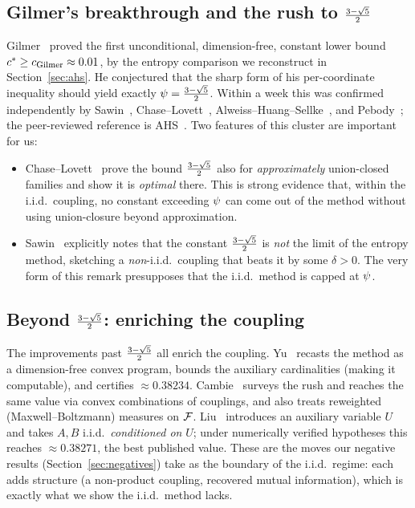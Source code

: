 \documentclass[11pt]{amsart}
\theoremstyle{definition}
\theoremstyle{remark}
\begin{document}
\subsection{Gilmer's breakthrough and the rush to $\tfrac{3-\sqrt{5}}{2}$}
Gilmer~\cite{gilmer2022} proved the first unconditional, dimension-free, constant
lower bound $c^{\ast}\ge c_{\text{Gilmer}}\approx 0.01$,
by the entropy comparison we reconstruct in Section~\ref{sec:ahs}. He conjectured
that the sharp form of his per-coordinate inequality should yield exactly
$\psi=\tfrac{3-\sqrt{5}}{2}$. Within a week this was confirmed independently by
Sawin~\cite{sawin2022}, Chase--Lovett~\cite{chaselovett2022},
Alweiss--Huang--Sellke~\cite{ahs2023}, and Pebody~\cite{pebody2022}; the
peer-reviewed reference is AHS~\cite{ahs2023}.
Two features of this cluster are important for us:
\begin{itemize}[leftmargin=1.4em]
\item Chase--Lovett~\cite{chaselovett2022} prove the bound $\tfrac{3-\sqrt{5}}{2}$ also for
\emph{approximately} union-closed families and show it is \emph{optimal} there.
This is strong evidence that, within the i.i.d.\ coupling, no constant exceeding
$\psi$ can come out of the method without using union-closure beyond
approximation.
\item Sawin~\cite{sawin2022} explicitly notes that the constant $\tfrac{3-\sqrt{5}}{2}$ is
\emph{not} the limit of the entropy method, sketching a \emph{non}-i.i.d.\
coupling that beats it by some $\delta>0$. The very form of this remark
presupposes that the i.i.d.\ method is capped at $\psi$.
\end{itemize}

\subsection{Beyond $\tfrac{3-\sqrt{5}}{2}$: enriching the coupling}
The improvements past $\tfrac{3-\sqrt{5}}{2}$ all enrich the coupling.
Yu~\cite{yu2023} recasts the method as a dimension-free convex program, bounds
the auxiliary cardinalities (making it computable), and certifies
$\approx 0.38234$.
Cambie~\cite{cambie2023} surveys the rush and reaches the same value via
convex combinations of couplings, and also treats reweighted (Maxwell--Boltzmann)
measures on $\mathcal{F}$. Liu~\cite{liu2023} introduces an auxiliary variable $U$ and
takes $A,B$ i.i.d.\ \emph{conditioned on} $U$; under numerically verified
hypotheses this reaches $\approx 0.38271$,
the best published value. These are the moves our negative results
(Section~\ref{sec:negatives}) take as the boundary of the i.i.d.\ regime: each
adds structure (a non-product coupling, recovered mutual information), which is
exactly what we show the i.i.d.\ method lacks.
\end{document}

